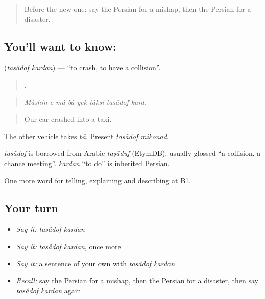 \label{lesson:FA-C324-tasadof-kardan}



\begin{quote}
Before the new one: say the Persian for a mishap, then the Persian for a disaster.
\end{quote}

\subsection*{You'll want to know:  }
\textbf{ } (\emph{tasâdof kardan}) — \textquotedblleft{}to crash, to have a collision\textquotedblright{}.

\begin{quote}
      .
\end{quote}

\begin{quote}
\emph{Mâshin-e mâ bâ yek tâksi tasâdof kard.}
\end{quote}

\begin{quote}
Our car crashed into a taxi.
\end{quote}

The other vehicle takes \emph{bâ}. Present \emph{tasâdof mikonad}.

\begin{cousinweb}
\emph{tasâdof} is borrowed from Arabic \emph{taṣāduf} (EtymDB), usually glossed \textquotedblleft{}a collision, a chance meeting\textquotedblright{}. \emph{kardan} \textquotedblleft{}to do\textquotedblright{} is inherited Persian.
\end{cousinweb}

\begin{grammarlens}[title={What you've built}]
One more word for telling, explaining and describing at B1.
\end{grammarlens}

\subsection*{Your turn}
\begin{itemize}
\raggedright
  \item \emph{Say it:} \emph{tasâdof kardan}
  \item \emph{Say it:} \emph{tasâdof kardan}, once more
  \item \emph{Say it:} a sentence of your own with \emph{tasâdof kardan}
  \item \emph{Recall:} say the Persian for a mishap, then the Persian for a disaster, then say \emph{tasâdof kardan} again
\end{itemize}

